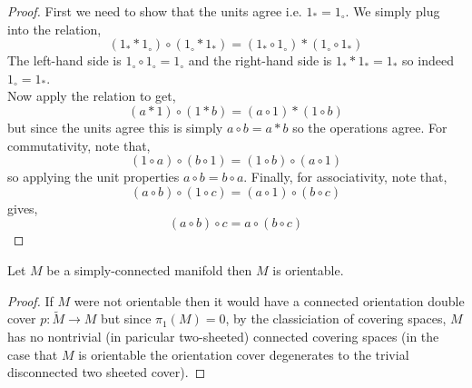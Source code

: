 \documentclass[12pt]{extarticle}
\begin{document}
\begin{proof}
First we need to show that the units agree i.e. $1_* = 1_\circ$. We simply plug into the relation,
\[ (1_* * 1_\circ) \circ (1_\circ * 1_*) = (1_* \circ 1_\circ) * (1_\circ \circ 1_*) \]
The left-hand side is $1_\circ \circ 1_\circ = 1_\circ$ and the right-hand side is $1_* * 1_* = 1_*$ so indeed $1_\circ = 1_*$. 
\bigskip\\
Now apply the relation to get,
\[ (a * 1) \circ (1 * b) = (a \circ 1) * (1 \circ b) \]
but since the units agree this is simply $a \circ b = a * b$ so the operations agree. For commutativity, note that,
\[ (1 \circ a) \circ (b \circ 1) = (1 \circ b) \circ (a \circ 1) \]
so applying the unit properties $a \circ b = b \circ a$. Finally, for associativity, note that,
\[ (a \circ b) \circ (1 \circ c) = (a \circ 1) \circ (b \circ c) \]
gives,
\[ (a \circ b) \circ c = a \circ (b \circ c) \]
\end{proof}


\label{orientable_if_simply_connected}
\begin{lemma}
Let $M$ be a simply-connected manifold then $M$ is orientable.
\end{lemma}

\begin{proof}
If $M$ were not orientable then it would have a connected orientation double cover $p : \tilde{M} \to M$ but since $\pi_1(M) = 0$, by the classiciation of covering spaces, $M$ has no nontrivial (in paricular two-sheeted) connected covering spaces (in the case that $M$ is orientable the orientation cover degenerates to the trivial disconnected two sheeted cover).
\end{proof}
\end{document}
